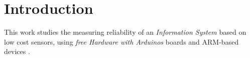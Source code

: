 
\chapter{Introduction}


This work studies the measuring reliability of an \textit{Information System} based on low cost sensors, using \textit{free Hardware with Arduinos} \cite{noauthor_arduino_nodate-1, jjtorres_hardware_2014} boards and ARM-based devices \cite{ltd_leadership_nodate, ltd_-profile_nodate}.\\





